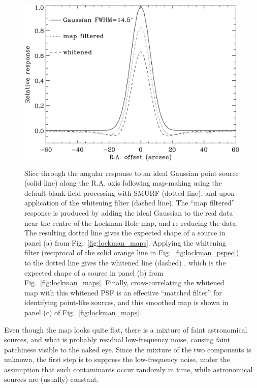 \documentclass[useAMS,usenatbib,nofootinbib]{mn2e}
\begin{document}
\begin{figure}
\centering
\includegraphics[width=\linewidth]{lockman_psf}
\caption{Slice through the angular response to an ideal Gaussian point
  source (solid line) along the R.A. axis following map-making using
  the default blank-field processing with SMURF (dotted line), and
  upon application of the whitening filter (dashed line). The ``map
  filtered'' response is produced by adding the ideal Gaussian to the
  real data near the centre of the Lockman Hole map, and re-reducing
  the data. The resulting dotted line gives the expected shape of a
  source in panel (a) from Fig.~\ref{fig:lockman_maps}. Applying the
  whitening filter (reciprocal of the solid orange line in
  Fig.~\ref{fig:lockman_pspec}) to the dotted line gives the whitened
  line (dashed) , which is the expected shape of a source in panel (b)
  from Fig.~\ref{fig:lockman_maps}. Finally, cross-correlating the
  whitened map with this whitened PSF is an effective ``matched
  filter'' for identifying point-like sources, and this smoothed map
  is shown in panel (c) of Fig.~\ref{fig:lockman_maps}.}
\label{fig:lockman_psf}
\end{figure}

Even though the map looks quite flat, there is a mixture of faint
astronomical sources, and what is probably residual low-frequency
noise, causing faint patchiness visible to the naked eye. Since the
mixture of the two components is unknown, the first step is to
suppress the low-frequency noise, under the assumption that such
contaminants occur randomly in time, while astronomical sources are
(usually) constant.
\end{document}
